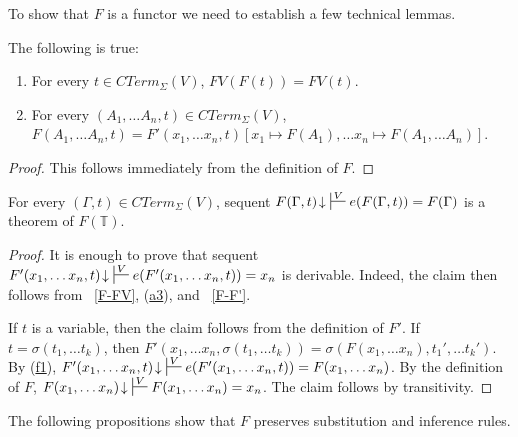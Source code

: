 \documentclass[reqno]{amsart}
\newcommand{\axref}[1]{(\hyperref[ax:#1]{#1})}
\theoremstyle{definition}
\theoremstyle{remark}
\numberwithin{figure}{section}
\begin{document}
To show that $F$ is a functor we need to establish a few technical lemmas.

\begin{lem}[F-basic]
The following is true:
\begin{enumerate}
\item \label{F-FV}
For every $t \in CTerm_\Sigma(V)$, $FV(F(t)) = FV(t)$.
\item \label{F-F'}
For every $(A_1, \ldots A_n, t) \in CTerm_\Sigma(V)$, $F(A_1, \ldots A_n, t) = F'(x_1, \ldots x_n, t) \allowbreak [x_1 \mapsto F(A_1), \ldots x_n \mapsto F(A_1, \ldots A_n)]$.
\end{enumerate}
\end{lem}
\begin{proof}
This follows immediately from the definition of $F$.
\end{proof}

\begin{lem}[F-e]
For every $(\Gamma,t) \in CTerm_\Sigma(V)$, sequent $F(\Gamma,t)\!\downarrow\ \sststile{}{V} e(F(\Gamma,t)) = F(\Gamma)$ is a theorem of $F(\mathbb{T})$.
\end{lem}
\begin{proof}
It is enough to prove that sequent $F'(x_1, \ldots x_n, t)\!\downarrow\ \sststile{}{V} e(F'(x_1, \ldots x_n, t)) = x_n$ is derivable.
Indeed, the claim then follows from ~\eqref{F-FV}, \axref{a3}, and ~\eqref{F-F'}.

If $t$ is a variable, then the claim follows from the definition of $F'$.
If $t = \sigma(t_1, \ldots t_k)$, then $F'(x_1, \ldots x_n, \sigma(t_1, \ldots t_k)) = \sigma(F(x_1, \ldots x_n), t_1', \ldots t_k')$.
By \axref{f1}, $F'(x_1, \ldots x_n, t)\!\downarrow\ \sststile{}{V} e(F'(x_1, \ldots x_n, t)) = F(x_1, \ldots x_n)$.
By the definition of $F$, $F(x_1, \ldots x_n)\!\downarrow\ \sststile{}{V} F(x_1, \ldots x_n) = x_n$.
The claim follows by transitivity.
\end{proof}

The following propositions show that $F$ preserves substitution and inference rules.
\end{document}
